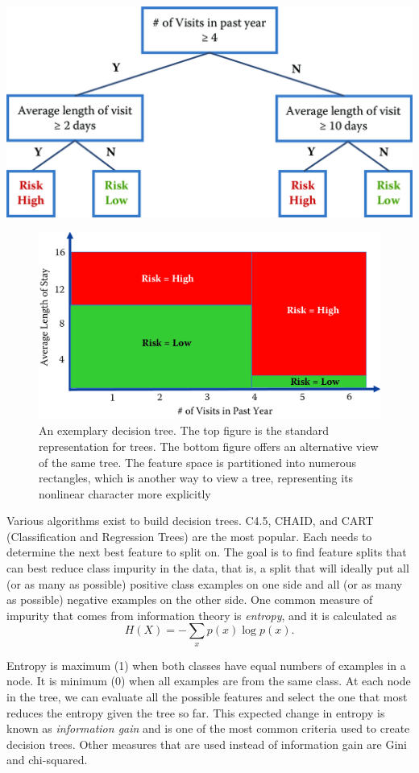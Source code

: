 \documentclass[]{krantz}
\begin{document}
\begin{center}\includegraphics[width=0.7\linewidth]{ChapterML/figures/tree} \end{center}

\begin{figure}

{\centering \includegraphics[width=0.7\linewidth]{ChapterML/figures/tree-rectangle} 

}

\caption{An exemplary decision tree. The top figure is the standard representation for trees. The bottom figure offers an alternative view of the same tree. The feature space is partitioned into numerous rectangles, which is another way to view a tree, representing its nonlinear character more explicitly}\label{fig:tree}
\end{figure}

Various algorithms exist to build decision trees. C4.5, CHAID, and CART
(Classification and Regression Trees) are the most popular. Each needs
to determine the next best feature to split on. The goal is to find
feature splits that can best reduce class impurity in the data, that is,
a split that will ideally put all (or as many as possible) positive
class examples on one side and all (or as many as possible) negative
examples on the other side. One common measure of impurity that comes
from information theory is \emph{entropy}, and it is calculated as
\[H(X) = -\sum_x p(x) \log p(x).\]

Entropy is maximum (1) when both classes have equal numbers of examples
in a node. It is minimum (0) when all examples are from the same class.
At each node in the tree, we can evaluate all the possible features and
select the one that most reduces the entropy given the tree so far. This
expected change in entropy is known as \emph{information gain} and is
one of the most common criteria used to create decision trees. Other
measures that are used instead of information gain are Gini and
chi-squared.
\end{document}
